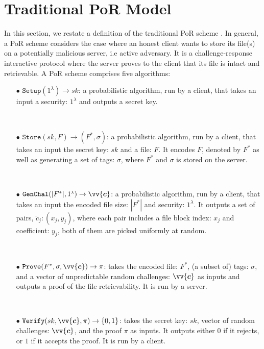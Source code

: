 \section {Traditional PoR Model}\label{PoR-Model}

In this section, we restate a  definition of the traditional PoR scheme \cite{DBLP:conf/asiacrypt/ShachamW08}. In general, a PoR scheme considers the case where an honest client wants to store its file(s) on a  potentially malicious server, i.e active adversary. It is a challenge-response interactive protocol where the server proves to the client that its file is intact and retrievable. A PoR scheme comprises five algorithms: 

\begin{itemize}
\item[$\bullet$] $\mathtt{Setup}(1^{\scriptscriptstyle\lambda})\rightarrow sk$:  a probabilistic algorithm, run by a client, that takes an input a security:  $1^{\scriptscriptstyle\lambda}$ and outputs a secret key.

\

\item[$\bullet$] $\mathtt{Store}(sk,F)\rightarrow (F^{*}, \sigma)$: a probabilistic algorithm, run by a client, that takes an input the secret key: $sk$ and a file: $F$. It encodes $F$, denoted by $F^{*}$ as well as generating a set of  tags: $\sigma$, where $F^{*}$ and  $\sigma$ is stored on the server.

\

\item[$\bullet$] $\mathtt{GenChal}(|F^{*}|, 1^{\scriptscriptstyle\lambda})\rightarrow \vv{\bm{c}}$: a probabilistic algorithm, run by a client, that takes an input the encoded file size: $|F^{*}|$ and security:  $1^{\scriptscriptstyle\lambda}$. It outputs a set of pairs, $\ddot{c}_{\scriptscriptstyle j}:(x_{\scriptscriptstyle j},y_{\scriptscriptstyle j})$, where each pair includes a file block index: $x_{\scriptscriptstyle j}$ and coefficient: $y_{\scriptscriptstyle j}$, both of them are picked uniformly at random.

\

\item[$\bullet$] $\mathtt{Prove}(F^{*}, \sigma, \vv{\bm{c}})\rightarrow \pi$:  takes the encoded file: $F^{*}$, (a subset of) tags: $\sigma$, and a vector of unpredictable random challenges: $\vv{\bm{c}}$ as inputs and outputs a proof of the file retrievability. It is run by a server.

\

\item[$\bullet$] $\mathtt{Verify}(sk,\vv{\bm{c}}, \pi)\rightarrow\{0,1\}$: takes the secret key: $sk$,  vector of random challenges: $\vv{\bm{c}}$, and the proof $\pi$ as inputs. It outputs either $0$ if it rejects,  or $1$ if it accepts the proof. It is run by a client.

\end{itemize}


